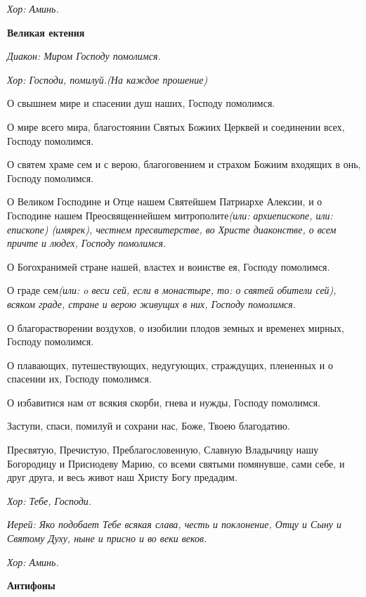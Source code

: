 \itshape Хор:\normalfont{} Аминь.


\medskip
\bfseries Великая ектения\normalfont{}\nopagebreak


\itshape Диакон:\normalfont{} Миром Господу помолимся. 


\itshape Хор:\normalfont{} Господи, помилуй.\itshape  (На каждое прошение)\normalfont{}


О свышнем мире и спасении душ наших, Господу помолимся. 


О мире всего мира, благостоянии Святых Божиих Церквей и соединении всех, Господу помолимся.


О святем храме сем и с верою, благоговением и страхом Божиим входящих в онь, Господу помолимся. 


О Великом Господине и Отце нашем Святейшем Патриархе Алексии, и о Господине нашем Преосвященнейшем митрополите\itshape  (или:\normalfont{} архиепископе\itshape , или:\normalfont{} епископе\itshape ) (имярек)\normalfont{}, честнем пресвитерстве, во Христе диаконстве, о всем причте и людех, Господу помолимся. 


О Богохранимей стране нашей, властех и воинстве ея, Господу помолимся.


О граде сем\itshape  (или:\normalfont{} o веси сей\itshape , если в монастыре, то: о\normalfont{} святей обители сей), всяком граде, стране и верою живущих в них, Господу помолимся. 


О благорастворении воздухов, о изобилии плодов земных и временех мирных, Господу помолимся.


О плавающих, путешествующих, недугующих, страждущих, плененных и о спасении их, Господу помолимся. 


О избавитися нам от всякия скорби, гнева и нужды, Господу помолимся. 


Заступи, спаси, помилуй и сохрани нас, Боже, Твоею благодатию. 


Пресвятую, Пречистую, Преблагословенную, Славную Владычицу нашу Богородицу и Приснодеву Марию, со всеми святыми помянувше, сами себе, и друг друга, и весь живот наш Христу Богу предадим. 


\itshape Хор:\normalfont{} Тебе, Господи. 


\itshape Иерей:\normalfont{} Яко подобает Тебе всякая слава, честь и поклонение, Отцу и Сыну и Святому Духу, ныне и присно и во веки веков. 


\itshape Хор:\normalfont{} Аминь.


\medskip
\bfseries Антифоны\normalfont{}\nopagebreak


